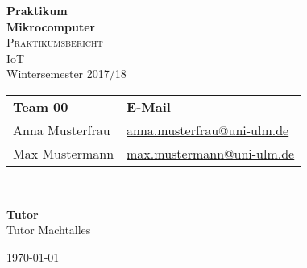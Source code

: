 \begin{titlepage}
\begin{center}
{\huge \bfseries Praktikum\\[9pt]Mikrocomputer\\}%
\vfill
{\large \textsc{Praktikumsbericht}}\\[9pt]
\vfill
{\large IoT}\\[9pt]
{\normalsize Wintersemester 2017/18}\\[9pt]
\vfill
\begin{minipage}{0.5\textwidth}
\normalsize
\begin{flushleft}
\begin{tabular}{@{}ll@{}} 
\textbf{Team 00} & \textbf{E-Mail}\\
Anna Musterfrau & \href{mailto:anna.musterfrau@uni-ulm.de}{anna.musterfrau@uni-ulm.de}\\
Max Mustermann & \href{mailto:max.mustermann@uni-ulm.de}{max.mustermann@uni-ulm.de}
\end{tabular}\\
\end{flushleft}
\end{minipage}
\hfill
\begin{minipage}{0.4\textwidth}
\normalsize
\begin{flushright}
\textbf{Tutor} \\
Tutor Machtalles
\end{flushright}
\end{minipage}
\vfill
{\normalsize \today}
\end{center}
\end{titlepage}